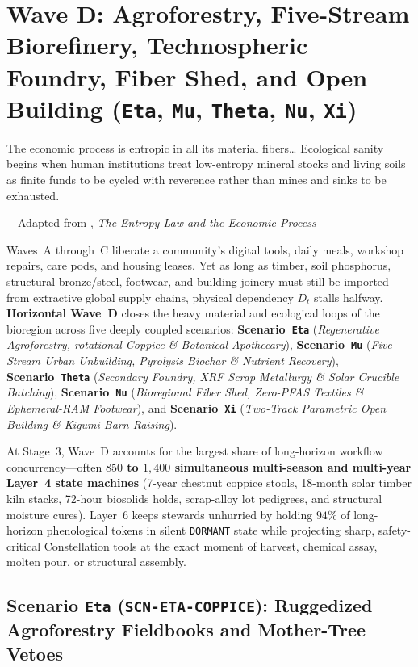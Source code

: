 \chapter{Wave D: Agroforestry, Five-Stream Biorefinery, Technospheric Foundry, Fiber Shed, and Open Building (\texttt{Eta}, \texttt{Mu}, \texttt{Theta}, \texttt{Nu}, \texttt{Xi})}
\label{ch:wave-d}

\epigraph{The economic process is entropic in all its material fibers\ldots{} Ecological sanity begins when human institutions treat low-entropy mineral stocks and living soils as finite funds to be cycled with reverence rather than mines and sinks to be exhausted.}{---Adapted from \textcite{georgescu1971}, \textit{The Entropy Law and the Economic Process}}

Waves~A through~C liberate a community's digital tools, daily meals, workshop repairs, care pods, and housing leases. Yet as long as timber, soil phosphorus, structural bronze/steel, footwear, and building joinery must still be imported from extractive global supply chains, physical dependency $D_t$ stalls halfway. \textbf{Horizontal Wave~D} closes the heavy material and ecological loops of the bioregion across five deeply coupled scenarios: \textbf{Scenario~\texttt{Eta}} (\textit{Regenerative Agroforestry, rotational Coppice \& Botanical Apothecary}), \textbf{Scenario~\texttt{Mu}} (\textit{Five-Stream Urban Unbuilding, Pyrolysis Biochar \& Nutrient Recovery}), \textbf{Scenario~\texttt{Theta}} (\textit{Secondary Foundry, XRF Scrap Metallurgy \& Solar Crucible Batching}), \textbf{Scenario~\texttt{Nu}} (\textit{Bioregional Fiber Shed, Zero-PFAS Textiles \& Ephemeral-RAM Footwear}), and \textbf{Scenario~\texttt{Xi}} (\textit{Two-Track Parametric Open Building \& Kigumi Barn-Raising}).

At Stage~3, Wave~D accounts for the largest share of long-horizon workflow concurrency---often \textbf{$850$ to $1{,}400$ simultaneous multi-season and multi-year Layer~4 state machines} (7-year chestnut coppice stools, 18-month solar timber kiln stacks, 72-hour biosolids holds, scrap-alloy lot pedigrees, and structural moisture cures). Layer~6 keeps stewards unhurried by holding $94\%$ of long-horizon phenological tokens in silent \texttt{DORMANT} state while projecting sharp, safety-critical Constellation tools at the exact moment of harvest, chemical assay, molten pour, or structural assembly.

\section{Scenario \texttt{Eta} (\texttt{SCN-ETA-COPPICE}): Ruggedized Agroforestry Fieldbooks and Mother-Tree Vetoes}
\label{sec:wave-d-eta}

